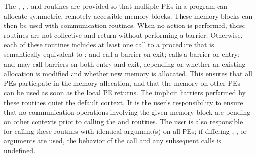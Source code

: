 \begin{apidefinition}
{    The , , , and  routines
    are provided  so that multiple \acp{PE} in a program can allocate symmetric,
    remotely accessible memory blocks.  These memory blocks can then be used with
    \openshmem communication routines.  When no action is performed, these
    routines are not collective and return without performing a barrier.
    Otherwise, each of these routines includes at least one
    call to a procedure that is semantically equivalent to :
     and  call a
    barrier on exit;  calls a barrier on entry; and
     may call barriers on both entry and exit, depending on
    whether an existing allocation is modified and whether new memory is allocated.
    This ensures that all
    \acp{PE} participate in the memory allocation, and that the memory on other
    \acp{PE} can be used as soon as the local \ac{PE} returns.
    The implicit barriers performed by these routines quiet the
    default context.  It is the user's responsibility to ensure that no
    communication operations involving the given memory block are pending on
    other contexts prior to calling
    the  and  routines.
    The user is also
    responsible for calling these routines with identical argument(s) on all
    \acp{PE}; if differing , , or  arguments are used, the behavior of the call
    and any subsequent \openshmem calls is undefined.
}


\end{apidefinition}
